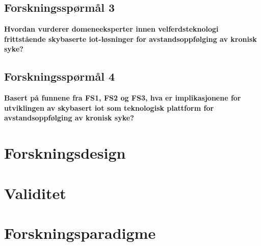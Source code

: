 \subsection{Forskningsspørmål 3}
\textbf{Hvordan vurderer domeneeksperter innen velferdsteknologi frittstående skybaserte \gls{iot}-løsninger for avstandsoppfølging av kronisk syke?}
 
\subsection{Forskningsspørmål 4}
\textbf{Basert på funnene fra FS1, FS2 og FS3, hva er implikasjonene for utviklingen av skybasert \gls{iot} som teknologisk plattform
    for avstandsoppfølging av kronisk syke?}

\section{Forskningsdesign}
\blindtext

\section{Validitet}

\section{Forskningsparadigme}
